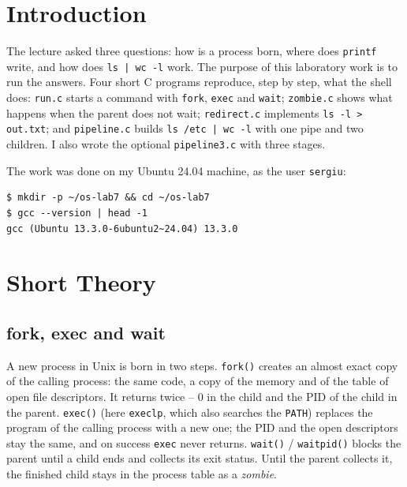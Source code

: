 \documentclass[12pt,a4paper]{article}
\begin{document}
\setcounter{page}{2}
\tableofcontents
\newpage

\section*{Introduction}

The lecture asked three questions: how is a process born, where does \texttt{printf} write, and how does \texttt{ls | wc -l} work. The purpose of this laboratory work is to run the answers. Four short C programs reproduce, step by step, what the shell does: \texttt{run.c} starts a command with \texttt{fork}, \texttt{exec} and \texttt{wait}; \texttt{zombie.c} shows what happens when the parent does not wait; \texttt{redirect.c} implements \texttt{ls -l > out.txt}; and \texttt{pipeline.c} builds \texttt{ls /etc | wc -l} with one pipe and two children. I also wrote the optional \texttt{pipeline3.c} with three stages.

The work was done on my Ubuntu 24.04 machine, as the user \texttt{sergiu}:

\begin{lstlisting}[style=terminal,caption={Preparation}]
$ mkdir -p ~/os-lab7 && cd ~/os-lab7
$ gcc --version | head -1
gcc (Ubuntu 13.3.0-6ubuntu2~24.04) 13.3.0
\end{lstlisting}

\newpage
\section{Short Theory}

\subsection{fork, exec and wait}

A new process in Unix is born in two steps. \texttt{fork()} creates an almost exact copy of the calling process: the same code, a copy of the memory and of the table of open file descriptors. It returns twice -- 0 in the child and the PID of the child in the parent. \texttt{exec()} (here \texttt{execlp}, which also searches the \texttt{PATH}) replaces the program of the calling process with a new one; the PID and the open descriptors stay the same, and on success \texttt{exec} never returns. \texttt{wait()} / \texttt{waitpid()} blocks the parent until a child ends and collects its exit status. Until the parent collects it, the finished child stays in the process table as a \textit{zombie}.
\end{document}
